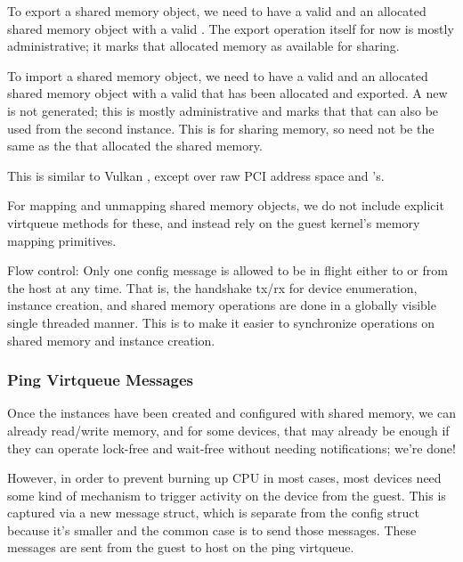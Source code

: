 To export a shared memory object, we need to have a valid 
and an allocated shared memory object with a valid .
The export operation itself for now is mostly administrative;
it marks that allocated memory as available for sharing.

To import a shared memory object, we need to have a valid 
and an allocated shared memory object with a valid 
that has been allocated and exported. A new  is not generated;
this is mostly administrative and marks that that 
can also be used from the second instance.
This is for sharing memory, so  need not
be the same as the  that allocated the shared memory.

This is similar to Vulkan ,
except over raw PCI address space and 's.

For mapping and unmapping shared memory objects,
we do not include explicit virtqueue methods for these,
and instead rely on the guest kernel's memory mapping primitives.

Flow control: Only one config message is allowed to be in flight
either to or from the host at any time.
That is, the handshake tx/rx for device enumeration, instance creation, and shared memory operations
are done in a globally visible single threaded manner.
This is to make it easier to synchronize operations on shared memory and instance creation.

\subsubsection{Ping Virtqueue Messages}\label{sec:Device Types / Host Memory Device / Device Operation / Ping Virtqueue Messages}

Once the instances have been created and configured with shared memory,
we can already read/write memory, and for some devices, that may already be enough
if they can operate lock-free and wait-free without needing notifications; we're done!

However, in order to prevent burning up CPU in most cases,
most devices need some kind of mechanism to trigger activity on the device
from the guest. This is captured via a new message struct,
which is separate from the config struct because it's smaller and
the common case is to send those messages.
These messages are sent from the guest to host
on the ping virtqueue.

